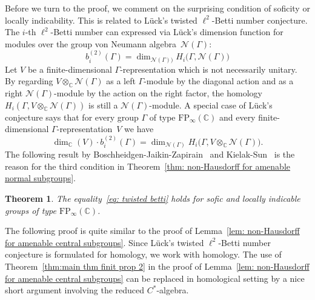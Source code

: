 \documentclass[12pt,reqno]{amsart}
\newcommand{\C}{\mathbb{C}}
\newcommand{\calN}{\mathcal{N}}
\newtheorem{theorem}{Theorem}[section]
\theoremstyle{definition}
\begin{document}
Before we turn to the proof, we comment on the surprising condition of soficity or locally indicability. 
This is related to L\"uck's twisted $\ell^2$-Betti number conjecture. The $i$-th $\ell^2$-Betti number can expressed 
via L\"uck's dimension function for modules over the group von Neumann algebra~$\calN(\Gamma)$: 
\[ 
b_i^{(2)}(\Gamma)=\dim_{\calN(\Gamma))} H_i\bigl(\Gamma, \calN(\Gamma)\bigr)\]
Let $V$ be a finite-dimensional $\Gamma$-representation which is not necessarily unitary. By regarding $V\otimes_\C \calN(\Gamma)$ as a left $\Gamma$-module by the diagonal action and as a right $\calN(\Gamma)$-module by the action on the right factor, the homology $H_i(\Gamma, V\otimes_\C \calN(\Gamma))$ is still a $\calN(\Gamma)$-module. A special case of L\"uck's conjecture says that for every group $\Gamma$ of type $\mathrm{FP}_\infty(\C)$ and every finite-dimensional $\Gamma$-representation~$V$ we have
\begin{equation}\label{eq: twisted betti} \dim_\C(V)\cdot b_i^{(2)}(\Gamma)=\dim_{\calN(\Gamma)} H_i\bigl(\Gamma, V\otimes_\C\calN(\Gamma)\bigr).
\end{equation}
The following result by Boschheidgen-Jaikin-Zapirain~\cite{BoschheidgenJaikin} and Kielak-Sun~\cite{kielak+sun} is the reason for the third condition in 
Theorem~\ref{thm: non-Hausdorff for amenable normal subgroups}.

\begin{theorem}\label{thm: proved case of twisted betti}
The equality~\eqref{eq: twisted betti} holds for sofic and locally indicable groups of type $\mathrm{FP}_\infty(\C)$. 
\end{theorem}

The following proof is quite similar to the proof of Lemma~\ref{lem: non-Hausdorff for amenable central subgroups}. Since L\"uck's twisted $\ell^2$-Betti number conjecture is formulated for homology, we work with homology. The use of Theorem~\ref{thm:main thm finit prop 2} in the proof of Lemma~\ref{lem: non-Hausdorff for amenable central subgroups} can be replaced in homological setting by a nice short argument involving the reduced $C^\ast$-algebra. 
\end{document}
